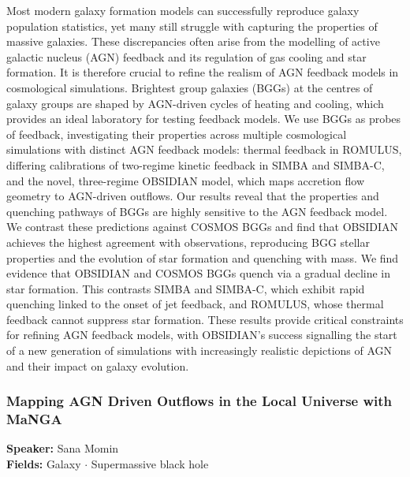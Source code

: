 Most modern galaxy formation models can successfully reproduce galaxy population statistics, yet many still struggle with capturing the properties of massive galaxies. These discrepancies often arise from the modelling of active galactic nucleus (AGN) feedback and its regulation of gas cooling and star formation. It is therefore crucial to refine the realism of AGN feedback models in cosmological simulations. Brightest group galaxies (BGGs) at the centres of galaxy groups are shaped by AGN-driven cycles of heating and cooling, which provides an ideal laboratory for testing feedback models. We use BGGs as probes of feedback, investigating their properties across multiple cosmological simulations with distinct AGN feedback models: thermal feedback in ROMULUS, differing calibrations of two-regime kinetic feedback in SIMBA and SIMBA-C, and the novel, three-regime OBSIDIAN model, which maps accretion flow geometry to AGN-driven outflows. Our results reveal that the properties and quenching pathways of BGGs are highly sensitive to the AGN feedback model. We contrast these predictions against COSMOS BGGs and find that OBSIDIAN achieves the highest agreement with observations, reproducing BGG stellar properties and the evolution of star formation and quenching with mass. We find evidence that OBSIDIAN and COSMOS BGGs quench via a gradual decline in star formation. This contrasts SIMBA and SIMBA-C, which exhibit rapid quenching linked to the onset of jet feedback, and ROMULUS, whose thermal feedback cannot suppress star formation. These results provide critical constraints for refining AGN feedback models, with OBSIDIAN's success signalling the start of a new generation of simulations with increasingly realistic depictions of AGN and their impact on galaxy evolution.

\hypertarget{abstract-talk-144}{}\label{abstract-page-talk-144}
\subsubsection*{Mapping AGN Driven Outflows in the Local Universe with MaNGA}
\textbf{Speaker:} Sana Momin\\
\textbf{Fields:} Galaxy $\cdot$ Supermassive black hole

